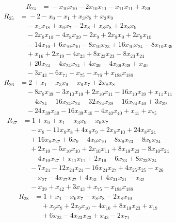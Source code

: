 \begin{align*}
R_{24}&={}-x_{10}x_{10} -2x_{10}x_{11} -x_{11}x_{11} +x_{39}
\end{align*}
\begin{align*}
R_{25}&={}-2 -x_{0} -x_{1} +x_{3}x_{8} +x_{3}x_{9}\\
&\quad{}-x_{4}x_{18} +x_{6}x_{7} -2x_{8} +x_{8}x_{8} +2x_{8}x_{9}\\
&\quad{}-2x_{8}x_{10} -4x_{8}x_{39} -2x_{9} +2x_{9}x_{9} +2x_{9}x_{10}\\
&\quad{}-14x_{10} +6x_{10}x_{10} -8x_{10}x_{23} +16x_{10}x_{24} -8x_{10}x_{39}\\
&\quad{}+x_{16} +2x_{19} -4x_{23} +8x_{23}x_{23} -8x_{23}x_{24}\\
&\quad{}+20x_{24} -4x_{24}x_{24} +4x_{39} -4x_{39}x_{39} +x_{40}\\
&\quad{}-3x_{43} -6x_{71} -x_{75} -x_{76} +x_{188}x_{188}
\end{align*}
\begin{align*}
R_{26}&={}2 +x_{1} -x_{3}x_{9} -x_{6}x_{7} +2x_{8}x_{8}\\
&\quad{}-8x_{8}x_{39} -3x_{10}x_{10} +2x_{10}x_{11} -16x_{10}x_{39} +x_{11}x_{11}\\
&\quad{}-4x_{24} -16x_{24}x_{24} -32x_{24}x_{39} -16x_{24}x_{40} +3x_{39}\\
&\quad{}-24x_{39}x_{39} -16x_{39}x_{40} -4x_{40}x_{40} +x_{41} +x_{75}
\end{align*}
\begin{align*}
R_{27}&={}1 +x_{0} +x_{1} -x_{3}x_{9} -x_{6}x_{7}\\
&\quad{}-x_{8} -11x_{8}x_{8} +4x_{8}x_{9} +2x_{8}x_{10} +24x_{8}x_{24}\\
&\quad{}+16x_{8}x_{27} +6x_{9} -4x_{9}x_{10} -8x_{9}x_{23} -8x_{9}x_{24}\\
&\quad{}+2x_{10} -5x_{10}x_{10} +2x_{10}x_{11} +8x_{10}x_{23} -8x_{10}x_{24}\\
&\quad{}-4x_{10}x_{27} +x_{11}x_{11} +2x_{19} -6x_{23} +8x_{23}x_{24}\\
&\quad{}-7x_{24} -12x_{24}x_{24} -16x_{24}x_{27} +4x_{25}x_{25} -x_{26}\\
&\quad{}-x_{27} -4x_{27}x_{27} +4x_{31} +4x_{31}x_{31} -x_{32}\\
&\quad{}-x_{39} +x_{42} +3x_{43} +x_{75} -x_{188}x_{188}
\end{align*}
\begin{align*}
R_{28}&={}1 +x_{1} -x_{6}x_{7} -x_{8}x_{8} -2x_{8}x_{10}\\
&\quad{}+x_{9}x_{9} +2x_{9}x_{10} -4x_{10} +8x_{10}x_{23} +x_{19}\\
&\quad{}+6x_{23} -4x_{23}x_{23} +x_{43} -2x_{71}
\end{align*}
